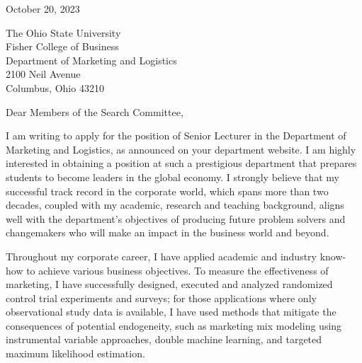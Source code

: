

October 20, 2023\\

\vspace{2.0ex}

The Ohio State University \\
Fisher College of Business  \\
Department of Marketing and Logistics \\
2100 Neil Avenue \\
Columbus, Ohio 43210 \\

\vspace{2.0ex}

Dear Members of the Search Committee, \\

\vspace{2.0ex}


I am writing to apply for the position of Senior Lecturer in the Department of Marketing and Logistics, as announced on your department website.  I am highly interested in obtaining a position at such a prestigious department that prepares students to become leaders in the global economy.  I strongly believe that my successful track record in the corporate world, which spans more than two decades, coupled with my academic, research and teaching background, aligns well with the department's objectives of producing future problem solvers and changemakers who will make an impact in the business world and beyond. \\

\vspace{2.0ex}

Throughout my corporate career, I have applied academic and industry know-how to achieve various business objectives.  To measure the effectiveness of marketing, I have successfully designed, executed and analyzed randomized control trial experiments and surveys; for those applications where only observational study data is available, I have used methods that mitigate the consequences of potential endogeneity, such as marketing mix modeling using instrumental variable approaches, double machine learning, and targeted maximum likelihood estimation. \\

\vspace{2.0ex}

